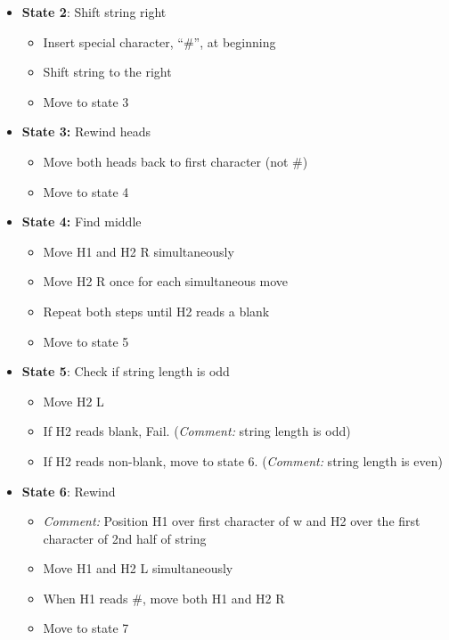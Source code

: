 \documentclass[12pt]{article}
\begin{document}
\begin{itemize}
\begin{itemize}
\begin{itemize}
	\end{itemize}\vspace{.2in}
	\item \textbf{State 2}: Shift string right
	\begin{itemize}
	\item Insert special character, ``\#'', at beginning
	\item Shift string to the right
	\item Move to state 3
	\end{itemize}\vspace{.2in}
	\item \textbf{State 3:} Rewind heads
	\begin{itemize}
	\item Move both heads back to first character (not \#)
	\item Move to state 4
	\end{itemize}\vspace{.2in}
	\item \textbf{State 4:} Find middle
	\begin{itemize}
	\item Move H1 and H2 R simultaneously
	\item Move H2 R once for each simultaneous move
	\item Repeat both steps until H2 reads a blank
	\item Move to state 5
	\end{itemize}\vspace{.2in}
	\item \textbf{State 5}: Check if string length is odd
	\begin{itemize}
	\item  Move H2 L
	\item  If H2 reads blank, Fail. (\textit{Comment:} string length is odd)
	\item  If H2 reads non-blank, move to state 6. (\textit{Comment:} string length is even)
	\end{itemize}\vspace{.2in}
	\item \textbf{State 6}: Rewind
	\begin{itemize}
	\item \textit{Comment:} Position H1 over first character of w and H2 over the first character of 2nd half of string
	\item Move H1 and H2 L simultaneously
	\item When H1 reads \#, move both H1 and H2 R
	\item Move to state 7

\end{itemize}
\end{itemize}
\end{itemize}
\end{document}
